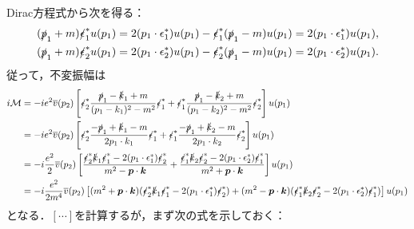 Dirac方程式から次を得る：
\begin{align*}
  (\slashed{p}_1 + m) \slashed{\epsilon}_1^\ast u(p_1) &= 2 (p_1 \cdot \epsilon_1^\ast) u(p_1) - \slashed{\epsilon}_1^\ast (\slashed{p}_1 - m) u(p_1) = 2 (p_1 \cdot \epsilon_1^\ast) u(p_1) , \\
  (\slashed{p}_1 + m) \slashed{\epsilon}_2^\ast u(p_1) &= 2 (p_1 \cdot \epsilon_2^\ast) u(p_1) - \slashed{\epsilon}_2^\ast (\slashed{p}_1 - m) u(p_1) = 2 (p_1 \cdot \epsilon_2^\ast) u(p_1) .
\end{align*}
従って，不変振幅は
\begin{align}
  \begin{split}
    i\mathcal{M} &= -ie^2 \overline{v}(p_2) \left[ \slashed{\epsilon}_2^\ast \frac{\slashed{p}_1 - \slashed{k}_1 + m}{(p_1 - k_1)^2 - m^2} \slashed{\epsilon}_1^\ast
    + \slashed{\epsilon}_1^\ast \frac{\slashed{p}_1 - \slashed{k}_2 + m}{(p_1 - k_2)^2 - m^2} \slashed{\epsilon}_2^\ast \right] u(p_1) \\
    &= -ie^2 \overline{v}(p_2) \left[ \slashed{\epsilon}_2^\ast \frac{-\slashed{p}_1 + \slashed{k}_1 - m}{2p_1 \cdot k_1} \slashed{\epsilon}_1^\ast
    + \slashed{\epsilon}_1^\ast \frac{-\slashed{p}_1 + \slashed{k}_2 - m}{2p_1 \cdot k_2} \slashed{\epsilon}_2^\ast \right] u(p_1) \\
    &= -i\frac{e^2}{2} \overline{v}(p_2) \left[
    \frac{\slashed{\epsilon}_2^\ast\slashed{k}_1\slashed{\epsilon}_1^\ast - 2(p_1 \cdot \epsilon_1^\ast)\slashed{\epsilon}_2^\ast}{m^2 - \boldsymbol{p} \cdot \boldsymbol{k}}
    + \frac{\slashed{\epsilon}_1^\ast\slashed{k}_2\slashed{\epsilon}_2^\ast - 2(p_1 \cdot \epsilon_2^\ast)\slashed{\epsilon}_1^\ast}{m^2 + \boldsymbol{p} \cdot \boldsymbol{k}}
    \right] u(p_1) \\
    &= -i\frac{e^2}{2m^4} \overline{v}(p_2) \left[
    (m^2 + \boldsymbol{p} \cdot \boldsymbol{k})(\slashed{\epsilon}_2^\ast\slashed{k}_1\slashed{\epsilon}_1^\ast - 2(p_1 \cdot \epsilon_1^\ast)\slashed{\epsilon}_2^\ast)
    + (m^2 - \boldsymbol{p} \cdot \boldsymbol{k})(\slashed{\epsilon}_1^\ast\slashed{k}_2\slashed{\epsilon}_2^\ast - 2(p_1 \cdot \epsilon_2^\ast)\slashed{\epsilon}_1^\ast)
    \right] u(p_1)
  \end{split}
  \label{prob5_4b_iM}
\end{align}
となる．$[\cdots]$を計算するが，まず次の式を示しておく：
